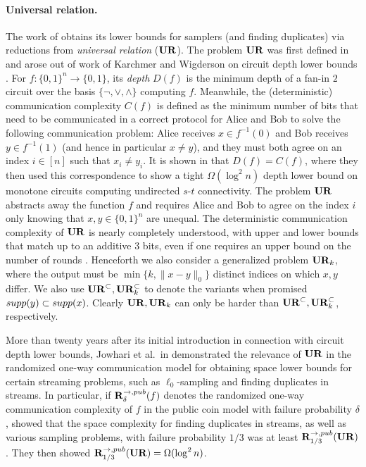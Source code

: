 \paragraph{Universal relation.} The work of \cite{JowhariST11} obtains its lower bounds for samplers (and finding duplicates) via reductions from {\em universal relation} ($\mathbf{UR}$). The problem $\mathbf{UR}$ was first defined in \cite{KarchmerRW95} and arose out of work of Karchmer and Wigderson on circuit depth lower bounds \cite{KarchmerW90}. For $f:\{0,1\}^n\rightarrow\{0,1\}$, its {\em depth} $D(f)$ is the minimum depth of a fan-in $2$ circuit over the basis $\{\neg, \vee, \wedge\}$ computing $f$. Meanwhile, the (deterministic) communication complexity $C(f)$ is defined as the minimum number of bits that need to be communicated in a correct protocol for Alice and Bob to solve the following communication problem: Alice receives $x\in f^{-1}(0)$ and Bob receives $y\in f^{-1}(1)$ (and hence in particular $x\neq y$), and they must both agree on an index $i\in[n]$ such that $x_i\neq y_i$. It is shown in \cite{KarchmerW90} that $D(f) = C(f)$, where they then used this correspondence to show a tight $\Omega(\log^2 n)$ depth lower bound on monotone circuits computing undirected $s$-$t$ connectivity. The problem $\mathbf{UR}$ abstracts away the function $f$ and requires Alice and Bob to agree on the index $i$ only knowing that $x,y\in\{0,1\}^n$ are unequal. The deterministic communication complexity of $\mathbf{UR}$ is nearly completely understood, with upper and lower bounds that match up to an additive $3$ bits, even if one requires an upper bound on the number of rounds \cite{TardosZ97}. Henceforth we also consider a generalized problem $\mathbf{UR}_k$, where the output must be $\min\{k, \|x-y\|_0\}$ distinct indices on which $x, y$ differ. We also use $\mathbf{UR}^{\subset}, \mathbf{UR}_k^{\subset}$ to denote the variants when promised $\mathop{supp}(y)\subset \mathop{supp}(x)$. Clearly $\mathbf{UR}, \mathbf{UR}_k$ can only be harder than $\mathbf{UR}^\subset, \mathbf{UR}_k^\subset$, respectively.

More than twenty years after its initial introduction in connection with circuit depth lower bounds, Jowhari et al.\ in \cite{JowhariST11} demonstrated the relevance of $\mathbf{UR}$ in the randomized one-way communication model for obtaining space lower bounds for certain streaming problems, such as $\ell_0$-sampling and finding duplicates in streams. In particular, if $\mathbf{R}^{\rightarrow,pub}_\delta(f)$ denotes the randomized one-way communication complexity of $f$ in the public coin model with failure probability $\delta$, \cite{JowhariST11} showed that the space complexity for finding duplicates in streams, as well as various sampling problems, with failure probability $1/3$ was at least $\mathbf{R}^{\rightarrow,pub}_{1/3}(\mathbf{UR})$. They then showed $\mathbf{R}^{\rightarrow,pub}_{1/3}(\mathbf{UR}) = \Omega(\log^2 n)$.


